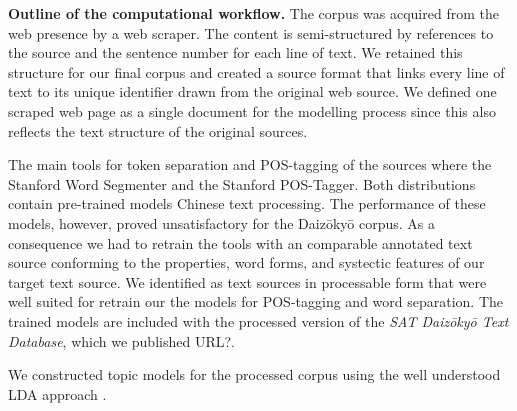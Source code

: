 \documentclass[a4paper,10pt]{article}
\newcommand{\TODO}[1]{\begingroup\color{red}#1\endgroup}
\begin{document}
\textbf{Outline of the computational workflow.} The corpus was acquired
from the web presence by a web scraper. The content is semi-structured by
references to the source and the sentence number for each line of text. We
retained this structure for our final corpus and created a source format
that links every line of text to its unique identifier drawn from the
original web source. We defined one scraped web page as a single document
for the modelling process since this also reflects the text structure of
the original sources.
    
  The main tools for token separation and POS-tagging of the sources where
  the Stanford Word Segmenter and the Stanford POS-Tagger. Both
  distributions contain pre-trained models Chinese text processing. The
  performance of these models, however, proved unsatisfactory for the
  Daiz{\=o}ky{\=o} corpus. As a consequence we had to retrain the tools
  with an comparable annotated text source conforming to the properties,
  word forms, and \TODO{systectic} features of our target text source.  We
  identified \cite{Lee:12,Wong:16} as text sources in processable form that
  were well suited for retrain our the models for POS-tagging and 
  word separation. The trained models are included with the
  processed version of the \textit{SAT Daiz{\=o}ky{\=o} Text Database},
  which we published \TODO{URL?}.  

  We constructed topic models for the processed corpus using the well
  understood LDA approach \cite{Blei03,GriffithStyvers05}.

\end{document}
